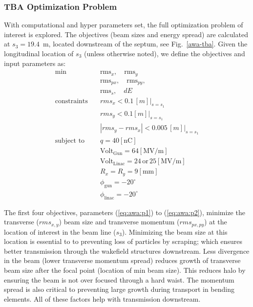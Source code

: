 \subsubsection{TBA Optimization Problem}
With computational and hyper parameters set, 
the full optimization problem of interest is explored.
The objectives (beam sizes and energy spread) are calculated at 
$s_3=19.4$~m, located downstream of the septum, see Fig.~\ref{awa-tba}. 
Given the longitudinal location of $s_3$ (unless otherwise noted), 
we define the objectives and input parameters as:
\begin{align}
\text{min}  \quad & \text{rms}_{x}, \quad \text{rms}_{y} \label{eq:awa:p1}\\
& \text{rms}_{px}, \quad \text{rms}_{py}, \label{eq:awa:p2}\\
& \text{rms}_{s}, \quad dE \label{eq:awa:p4} \\
\text{constraints} \quad & rms_x < 0.1 \, [m] |_{s=s_1}\label{eq:awa:c1}\\
\quad & rms_y < 0.1 [m] |_{s=s_1}\, \label{eq:awa:c2}\\
\quad & |rms_y - rms_x | < 0.005 \, [m] |_{s=s_1}\label{eq:awa:c3}\\
\text{subject to} \quad & q = 40 \left[\text{nC}\right] \label{eq:awa:firstconstr}\\
\quad & \text{Volt}_{\text{Gun}} = 64\left[\text{MV/m}\right] \label{eq:awa:lastconstr}\\
\quad & \text{Volt}_{\text{Linac}} = 24 \, \text{or} \, 25\left[\text{MV/m}\right] \\
\quad & R_x = R_y = 9 \left[\text{mm}\right] \label{eq:awa:firstdvar}\\
\quad & \phi_{\text{gun}} =-20^\circ \label{eq:awa:gphidvar}\\
\quad & \phi_{\text{linac}} =-20^\circ \label{eq:awa:lastdvar}
\end{align}



The first four objectives, parameters (\ref{eq:awa:p1}) to (\ref{eq:awa:p2}),
minimize the transverse ($rms_{x,y}$) beam size and transverse momentum ($rms_{px,py}$)
at the location of interest in the beam line ($s_3$).
Minimizing the beam size at this location is essential to 
to preventing loss of particles by scraping; 
which ensures better transmission through the wakefield structures downstream. 
Less divergence in the beam (lower transverse momentum spread) 
reduces growth of transverse beam size after the focal point (location of min beam size).
This reduces halo by ensuring the beam is not over focused through a hard waist.
The momentum spread is also critical to preventing large growth during transport in bending elements. 
All of these factors help with transmission downstream. 

